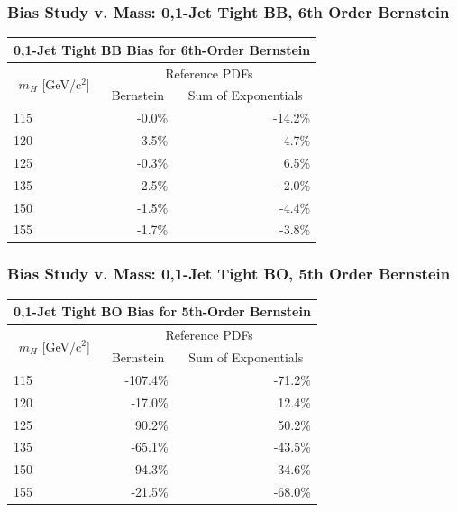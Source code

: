 \documentclass{beamer}
\begin{document}
\begin{frame}
\frametitle{Bias Study v. Mass: 0,1-Jet Tight BB, 6th Order Bernstein}
  \begin{center}
\begin{tabular}{|l|r|r|} \hline 
\multicolumn{3}{|c|}{ \bf 0,1-Jet Tight BB Bias for 6th-Order Bernstein} \\ \hline
\multicolumn{1}{|c|}{\multirow{2}{*}{$m_{H}$ [GeV/c$^{2}$]}} & \multicolumn{2}{c|}{Reference PDFs} \\ \cline{2-3} 
& \multicolumn{1}{c|}{      Bernstein} & \multicolumn{1}{c|}{Sum of Exponentials} \\ \hline
       115 &           -0.0\% &          -14.2\% \\ \hline
       120 &            3.5\% &            4.7\% \\ \hline
       125 &           -0.3\% &            6.5\% \\ \hline
       135 &           -2.5\% &           -2.0\% \\ \hline
       150 &           -1.5\% &           -4.4\% \\ \hline
       155 &           -1.7\% &           -3.8\% \\ \hline
\end{tabular}

  \end{center}
\end{frame}

\begin{frame}
\frametitle{Bias Study v. Mass: 0,1-Jet Tight BO, 5th Order Bernstein}
  \begin{center}
\begin{tabular}{|l|r|r|} \hline 
\multicolumn{3}{|c|}{ \bf 0,1-Jet Tight BO Bias for 5th-Order Bernstein} \\ \hline
\multicolumn{1}{|c|}{\multirow{2}{*}{$m_{H}$ [GeV/c$^{2}$]}} & \multicolumn{2}{c|}{Reference PDFs} \\ \cline{2-3} 
& \multicolumn{1}{c|}{      Bernstein} & \multicolumn{1}{c|}{Sum of Exponentials} \\ \hline
       115 &         -107.4\% &          -71.2\% \\ \hline
       120 &          -17.0\% &           12.4\% \\ \hline
       125 &           90.2\% &           50.2\% \\ \hline
       135 &          -65.1\% &          -43.5\% \\ \hline
       150 &           94.3\% &           34.6\% \\ \hline
       155 &          -21.5\% &          -68.0\% \\ \hline
\end{tabular}
  \end{center}
\end{frame}
\end{document}
